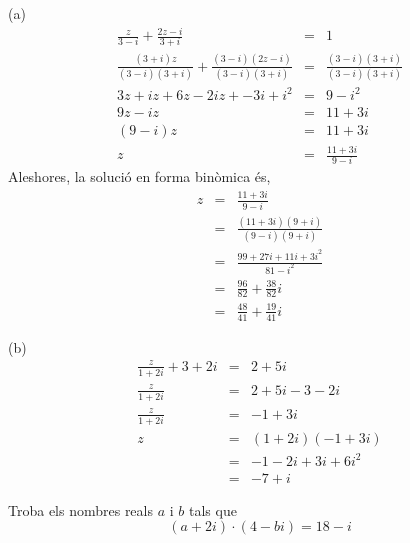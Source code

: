 \begin{solucio}
(a)
\begin{eqnarray*}
\frac{z}{3-i}+\frac{2z-i}{3+i} &=&1 \\
\frac{(3+i)z}{(3-i)(3+i)}+\frac{(3-i)(2z-i)}{(3-i)(3+i)} &=&\frac{(3-i)(3+i)
}{(3-i)(3+i)} \\
3z+iz+6z-2iz+-3i+i^{2} &=&9-i^{2} \\
9z-iz &=&11+3i \\
(9-i)z &=&11+3i \\
z &=&\frac{11+3i}{9-i}
\end{eqnarray*}
Aleshores, la solució en forma binòmica és,
\begin{eqnarray*}
z &=&\frac{11+3i}{9-i} \\
&=&\frac{(11+3i)(9+i)}{(9-i)(9+i)} \\
&=&\frac{99+27i+11i+3i^{2}}{81-i^{2}} \\
&=&\frac{96}{82}+\frac{38}{82}i \\
&=&\frac{48}{41}+\frac{19}{41}i
\end{eqnarray*}

(b)
\begin{eqnarray*}
\frac{z}{1+2i}+3+2i &=&2+5i \\
\frac{z}{1+2i} &=&2+5i-3-2i \\
\frac{z}{1+2i} &=&-1+3i \\
z &=&(1+2i)(-1+3i) \\
&=&-1-2i+3i+6i^{2} \\
&=&-7+i
\end{eqnarray*}
\end{solucio}

\begin{exemple}
Troba els nombres reals $a$ i $b$ tals que
\begin{equation*}
(a+2i)\cdot (4-bi)=18-i
\end{equation*}
\end{exemple}

